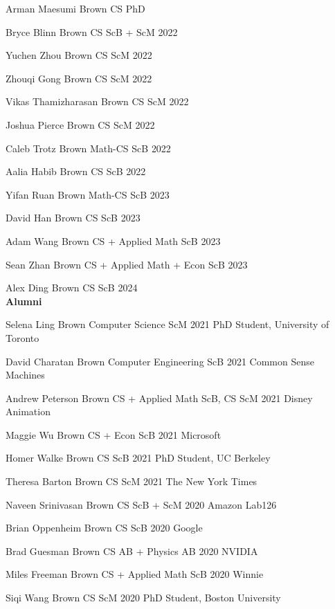 \documentclass[line,margin]{res}
\begin{document}
\begin{resume}
\currentphd
{Arman Maesumi}
{Brown CS PhD}

\student
{Bryce Blinn}
{Brown CS ScB + ScM}
{2022}	

\student
{Yuchen Zhou}
{Brown CS ScM}
{2022}

\student
{Zhouqi Gong}
{Brown CS ScM}
{2022}

\student
{Vikas Thamizharasan}
{Brown CS ScM}
{2022}

\student
{Joshua Pierce}
{Brown CS ScM}
{2022}

\student
{Caleb Trotz}
{Brown Math-CS ScB}
{2022}

\student
{Aalia Habib}
{Brown CS ScB}
{2022}

\student
{Yifan Ruan}
{Brown Math-CS ScB}
{2023}

\student
{David Han}
{Brown CS ScB}
{2023}

\student
{Adam Wang}
{Brown CS + Applied Math ScB}
{2023}

\student
{Sean Zhan}
{Brown CS + Applied Math + Econ ScB}
{2023}

\student
{Alex Ding}
{Brown CS ScB}
{2024}
\\


\textbf{Alumni}

\alumni
{Selena Ling}
{Brown Computer Science ScM}
{2021}
{PhD Student, University of Toronto}

\alumni
{David Charatan}
{Brown Computer Engineering ScB}
{2021}
{Common Sense Machines}

\alumni
{Andrew Peterson}
{Brown CS + Applied Math ScB, CS ScM}
{2021}
{Disney Animation}

\alumni
{Maggie Wu}
{Brown CS + Econ ScB}
{2021}
{Microsoft}

\alumni
{Homer Walke}
{Brown CS ScB}
{2021}
{PhD Student, UC Berkeley}

\alumni
{Theresa Barton}
{Brown CS ScM}
{2021}
{The New York Times}

\alumni
{Naveen Srinivasan}
{Brown CS ScB + ScM}
{2020}
{Amazon Lab126}

\alumni
{Brian Oppenheim}
{Brown CS ScB}
{2020}
{Google}

\alumni
{Brad Guesman}
{Brown CS AB + Physics AB}
{2020}
{NVIDIA}

\alumni
{Miles Freeman}
{Brown CS + Applied Math ScB}
{2020}
{Winnie}

\alumni
{Siqi Wang}
{Brown CS ScM}
{2020}
{PhD Student, Boston University}


\end{resume}
\end{document}
